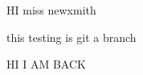 \documentclass[a4 paper,12pt]{article}
\begin{document}
HI  miss newxmith

this testing is git a branch

HI I AM BACK
\end{document}
